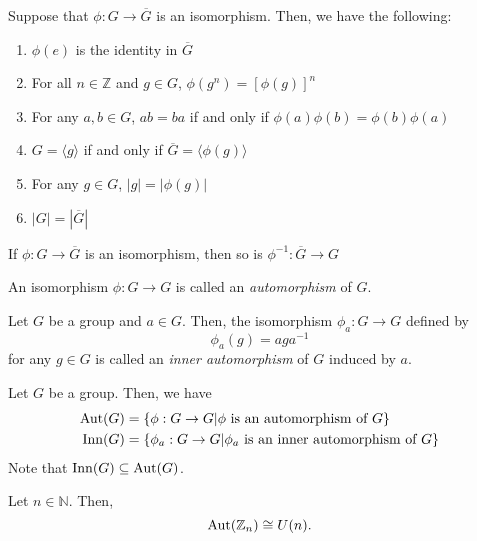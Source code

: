\begin{theorem}
    Suppose that \(\phi : G \to \overline{G}\) is an isomorphism. Then, we have the following:
    \begin{enumerate}
        \item \(\phi(e)\) is the identity in \(\overline{G}\)
        \item For all \(n \in \mathbb{Z}\) and \(g \in G\), \(\phi(g^n) = [\phi(g)]^n\)
        \item For any \(a, b \in G\), \(ab = ba\) if and only if \(\phi(a)\phi(b) = \phi(b)\phi(a)\)
        \item \(G = \langle g \rangle\) if and only if \(\overline{G} = \langle \phi(g) \rangle\)
        \item For any \(g \in G\), \(|g| = |\phi(g)|\)
        \item \(|G| = |\overline{G}|\)
    \end{enumerate}
\end{theorem}

\begin{theorem}
    If \(\phi: G \to \overline G\) is an isomorphism, then so is \(\phi^{-1} : \overline{G} \to G\)
\end{theorem}

\begin{definition}[Automorphism]
    An isomorphism \(\phi : G \to G\) is called an \textit{automorphism} of \(G\).
\end{definition}

\begin{definition}
    Let \(G\) be a group and \(a \in G\). Then, the isomorphism \(\phi_a : G \to G\) defined by
    \[
        \phi_a(g) = aga^{-1}
    \]
    for any \(g \in G\) is called an \textit{inner automorphism} of \(G\) induced by \(a\).
\end{definition}

\begin{definition}
    Let \(G\) be a group. Then, we have
    \[
    \begin{aligned}
        \operatorname{Aut}(G) &= \left\{\phi : G \to G | \text{\(\phi\) is an automorphism of \(G\)}\right\} \\
        \operatorname{Inn}(G) &= \left\{\phi_a : G \to G | \text{\(\phi_a\) is an inner automorphism of \(G\)}\right\}
    \end{aligned}
    \]
    Note that \(\operatorname{Inn}(G) \subseteq \operatorname{Aut}(G)\).
\end{definition}

\begin{theorem}
    Let \(n \in \mathbb{N}\). Then,
    \[
        \operatorname{Aut}(\mathbb{Z}_n) \cong U(n).
    \]
\end{theorem}

